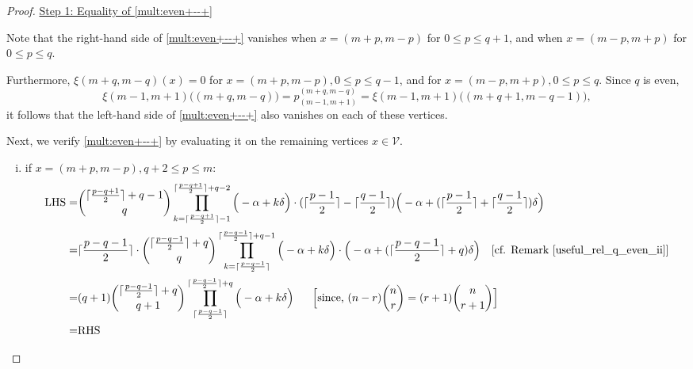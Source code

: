 \documentclass[10pt, a4paper, reqno]{amsart}
\begin{document}
	\begin{proof}
\underline{Step 1:	Equality of  \eqref{mult:even+--+}} 
	
	Note that the right-hand side of \eqref{mult:even+--+} vanishes when $x = (m+p, m-p)$ for $0 \leq p \leq q+1$, 
	and when $x = (m-p, m+p)$ for $0 \leq p \leq q$.  
	
	Furthermore, 	$\xi(m+q,m-q)(x)=0$ for $x = (m+p, m-p), 0 \leq p \leq q-1$, and  for $x = (m-p, m+p),0 \leq p \leq q$. 	Since $q$ is even,
	\[
	\xi(m-1, m+1)\big((m+q, m-q)\big)= p^{(m+q, m-q)}_{(m-1, m+1)}
	= \xi(m-1, m+1)\big((m+q+1, m-q-1)\big),
	\]
	it follows that the left-hand side of \eqref{mult:even+--+} also vanishes on each of these vertices. 
	
	Next, we verify  \eqref{mult:even+--+} by evaluating it on the remaining vertices $x \in \mathcal{V}$.
	
	
	
	
	\begin{enumerate}[(i)]
		
		\item if $x=(m+p,m-p), q+2\leq p\leq m$:
		\[\begin{split}
			\text{LHS}=&\binom{\lceil \frac{p-q+1}{2} \rceil + q-1}{\,q\,}\displaystyle\prod_{k=\lceil \frac{p-q+1}{2} \rceil -1}^{\lceil \frac{p-q+1}{2} \rceil +q-2}\Big(-\alpha +k\delta\Big)  \cdot    (\lceil \frac{p-1}{2}\rceil-\lceil \frac{q-1}{2}\rceil)    \Big(-\alpha +(\lceil \frac{p-1}{2}\rceil+\lceil \frac{q-1}{2}\rceil)\delta \Big)\\
			=& \displaystyle \lceil \frac{p-q-1}{2}\rceil \cdot\binom{\lceil \frac{p-q-1}{2} \rceil + q}{\,q\,}\prod_{k=\lceil \frac{p-q-1}{2} \rceil }^{\lceil \frac{p-q-1}{2} \rceil +q-1}\Big(-\alpha +k\delta\Big)  \cdot   \Big(-\alpha +(\lceil \frac{p-q-1}{2}\rceil+q)\delta \Big)  \text{ ~~[cf. Remark \ref{useful_rel_q_even_ii}]} \\
			=&(q+1)	\binom{\lceil \frac{p-q-1}{2} \rceil + q}{\,q+1\,}\displaystyle\prod_{\lceil \frac{p-q-1}{2} \rceil}^{\lceil \frac{p-q-1}{2} \rceil +q}\Big(-\alpha +k\delta\Big)~~~~~ \text{\Big [since, $(n-r)\binom{n}{r}=(r+1)\binom{n}{r+1}$\Big]}\\
			=&\text{RHS}
		\end{split}\]
		

\end{enumerate}
\end{proof}
\end{document}

